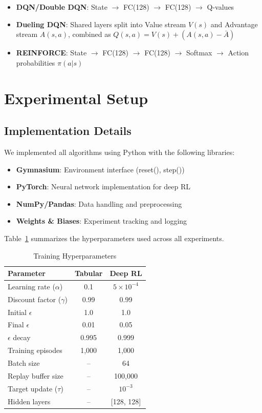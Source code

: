 \documentclass[conference]{IEEEtran}
\begin{document}
\begin{itemize}
    \item \textbf{DQN/Double DQN}: State $\rightarrow$ FC(128) $\rightarrow$ FC(128) $\rightarrow$ Q-values
    \item \textbf{Dueling DQN}: Shared layers split into Value stream $V(s)$ and Advantage stream $A(s,a)$, combined as $Q(s,a) = V(s) + (A(s,a) - \bar{A})$
    \item \textbf{REINFORCE}: State $\rightarrow$ FC(128) $\rightarrow$ FC(128) $\rightarrow$ Softmax $\rightarrow$ Action probabilities $\pi(a|s)$
\end{itemize}

\section{Experimental Setup}

\subsection{Implementation Details}
We implemented all algorithms using Python with the following libraries:
\begin{itemize}
    \item \textbf{Gymnasium}: Environment interface (reset(), step())
    \item \textbf{PyTorch}: Neural network implementation for deep RL
    \item \textbf{NumPy/Pandas}: Data handling and preprocessing
    \item \textbf{Weights \& Biases}: Experiment tracking and logging
\end{itemize}

Table~\ref{tab:hyperparams} summarizes the hyperparameters used across all experiments.

\begin{table}[htbp]
\centering
\caption{Training Hyperparameters}
\label{tab:hyperparams}
\begin{tabular}{lcc}
\toprule
\textbf{Parameter} & \textbf{Tabular} & \textbf{Deep RL} \\
\midrule
Learning rate ($\alpha$) & 0.1 & $5 \times 10^{-4}$ \\
Discount factor ($\gamma$) & 0.99 & 0.99 \\
Initial $\epsilon$ & 1.0 & 1.0 \\
Final $\epsilon$ & 0.01 & 0.05 \\
$\epsilon$ decay & 0.995 & 0.999 \\
Training episodes & 1,000 & 1,000 \\
Batch size & -- & 64 \\
Replay buffer size & -- & 100,000 \\
Target update ($\tau$) & -- & $10^{-3}$ \\
Hidden layers & -- & [128, 128] \\
\bottomrule
\end{tabular}
\end{table}
\end{document}
